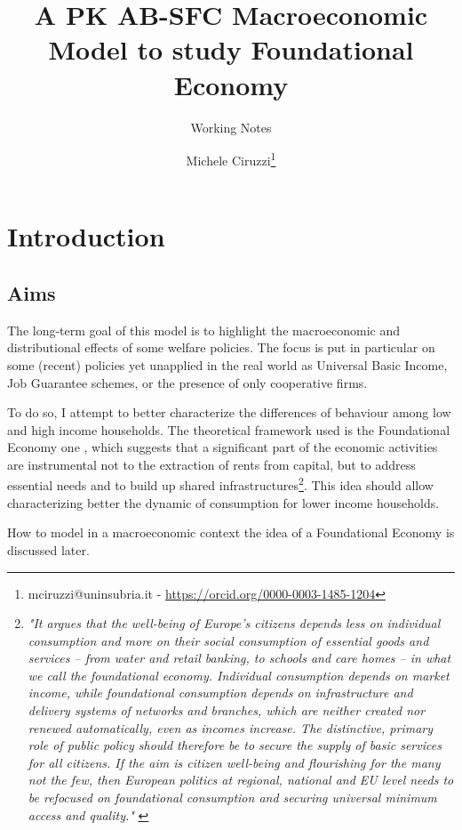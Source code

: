 \documentclass[a4paper, headings=standardclasses]{scrartcl}
\title{A PK AB-SFC Macroeconomic Model to study Foundational Economy\let\thefootnote\relax\footnotetext{
	An updated version of this paper and all the source code and the instructions required to replicate the paper are available at \url{https://github.com/TnTo/FE/}

	\hl{Highlighted} parts of the text indicate substantial choices to be taken.
  }}
\subtitle{Working Notes}
\author{Michele Ciruzzi\thanks{mciruzzi@uninsubria.it - \url{https://orcid.org/0000-0003-1485-1204}}}
\begin{document}
\maketitle


\section{Introduction}
\subsection{Aims}
The long-term goal of this model is to highlight the macroeconomic and distributional effects of some welfare policies.
The focus is put in particular on some (recent) policies yet unapplied in the real world as Universal Basic Income, Job Guarantee schemes, or the presence of only cooperative firms.

To do so, I attempt to better characterize the differences of behaviour among low and high income households.
The theoretical framework used is the Foundational Economy one \parencite{arcidiacono2018}, which suggests that a significant part of the economic activities are instrumental not to the extraction of rents from capital, but to address essential needs and to build up shared infrastructures\footnote{\textit{"It argues that the well-being of Europe's citizens depends less on individual consumption and more on their social consumption of essential goods and services – from water and retail banking, to schools and care homes – in what we call the foundational economy. Individual consumption depends on market income, while foundational consumption depends on infrastructure and delivery systems of networks and branches, which are neither created nor renewed automatically, even as incomes increase. The distinctive, primary role of public policy should therefore be to secure the supply of basic services for all citizens. If the aim is citizen well-being and flourishing for the many not the few, then European politics at regional, national and EU level needs to be refocused on foundational consumption and securing universal minimum access and quality."} \parencite{arcidiacono2018}}.
This idea should allow characterizing better the dynamic of consumption for lower income households.

How to model in a macroeconomic context the idea of a Foundational Economy is discussed later.
\end{document}
